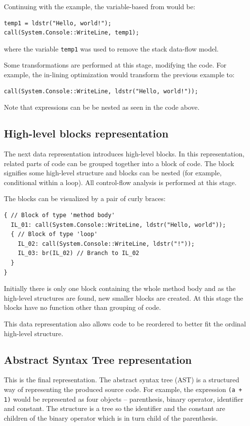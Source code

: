 \documentclass[12pt,twoside,notitlepage]{report}
\begin{document}
Continuing with the example, the variable-based from would be:
\begin{verbatim}
temp1 = ldstr("Hello, world!");
call(System.Console::WriteLine, temp1);
\end{verbatim}
where the variable \verb|temp1| was used to remove the stack data-flow model.

Some transformations are performed at this stage, modifying the
code.  For example, the in-lining optimization would transform
the previous example to:
\begin{verbatim}
call(System.Console::WriteLine, ldstr("Hello, world!"));
\end{verbatim}
Note that expressions can be be nested as seen in the code above.

\subsection{High-level blocks representation}
The next data representation introduces high-level blocks.
In this representation, related parts of code can be grouped 
together into a block of code.
The block signifies some high-level structure and blocks can 
be nested (for example, conditional within a loop).
All control-flow analysis is performed at this stage.

The blocks can be visualized by a pair of curly braces:
\begin{verbatim}
{ // Block of type 'method body'
  IL_01: call(System.Console::WriteLine, ldstr("Hello, world"));
  { // Block of type 'loop'
    IL_02: call(System.Console::WriteLine, ldstr("!"));
    IL_03: br(IL_02) // Branch to IL_02
  }
}
\end{verbatim}
Initially there is only one block containing the whole method
body and as the high-level structures are found, new smaller
blocks are created.  At this stage the blocks have no function
other than grouping of code.

This data representation also allows code to be reordered
to better fit the ordinal high-level structure.

\subsection{Abstract Syntax Tree representation}

This is the final representation.  The abstract syntax tree (AST)
is a structured way of representing the produced source code.
For example, the expression \verb|(a + 1)| would be represented
as four objects -- parenthesis, binary operator, identifier and
constant.  The structure is a tree so the identifier and the constant
are children of the binary operator which is in turn child of the
parenthesis.
\end{document}
